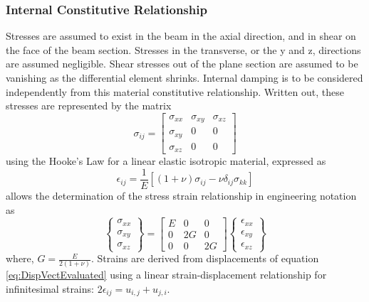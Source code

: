 \subsubsection{Internal Constitutive Relationship} \label{Internal Constitutive Relationship}
Stresses are assumed to exist in the beam in the axial direction, and in shear on the face of the beam section. Stresses in the transverse, or the y and z, directions are assumed negligible. Shear stresses out of the plane section are assumed to be vanishing as the differential element shrinks. Internal damping is to be considered independently from this material constitutive relationship. Written out, these stresses are represented by the matrix
\begin{equation}\label{key}
\sigma_{ij}=\left[\begin{array}{ccc}
\sigma_{xx}&\sigma_{xy}&\sigma_{xz}\\
\sigma_{xy}&0&0\\
\sigma_{xz}&0&0
\end{array}\right]
\end{equation}
using the Hooke's Law for a linear elastic isotropic material, expressed as
\begin{equation}\label{key}
\epsilon_{ij}=\frac{1}{E}[(1+\nu)\sigma_{ij}-\nu\delta_{ij}\sigma_{kk}]
\end{equation}
allows the determination of the stress strain relationship in engineering notation as
\begin{equation}\label{eq:ConstitutiveRelationshipEngineeringNotation}
\left\{\begin{array}{c}
\sigma_{xx}\\ \sigma_{xy}\\ \sigma_{xz}
\end{array}\right\} = \left[\begin{array}{ccc}
E&0&0\\0&2G&0\\0&0&2G
\end{array}\right] \left\{\begin{array}{c}
\epsilon_{xx}\\ \epsilon_{xy}\\ \epsilon_{xz}
\end{array}\right\}
\end{equation}
where, $ G=\frac{E}{2(1+\nu)} $. Strains are derived from displacements of equation \eqref{eq:DispVectEvaluated} using a linear strain-displacement relationship for infinitesimal strains: $ 2\epsilon_{ij}=u_{i,j}+u_{j,i} $.
